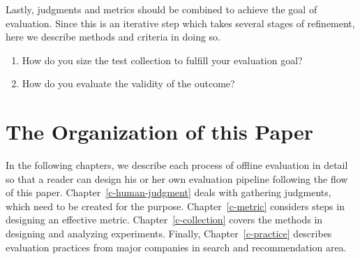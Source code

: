 
Lastly, judgments and metrics should be combined to achieve the goal of evaluation. Since this is an iterative step which takes several stages of refinement, here we describe methods and criteria in doing so. 

\begin{enumerate}
	\item How do you size the test collection to fulfill your evaluation goal?
	\item How do you evaluate the validity of the outcome?
\end{enumerate}


\section{The Organization of this Paper}

In the following chapters, we describe each process of offline evaluation in detail so that a reader can design his or her own evaluation pipeline following the flow of this paper. Chapter~\ref{c-human-judgment} deals with gathering judgments, which need to be created for the purpose. Chapter~\ref{c-metric} considers steps in designing an effective metric. Chapter~\ref{c-collection} covers the methods in designing and analyzing experiments. Finally, Chapter~\ref{c-practice} describes evaluation practices from major companies in search and recommendation area.


